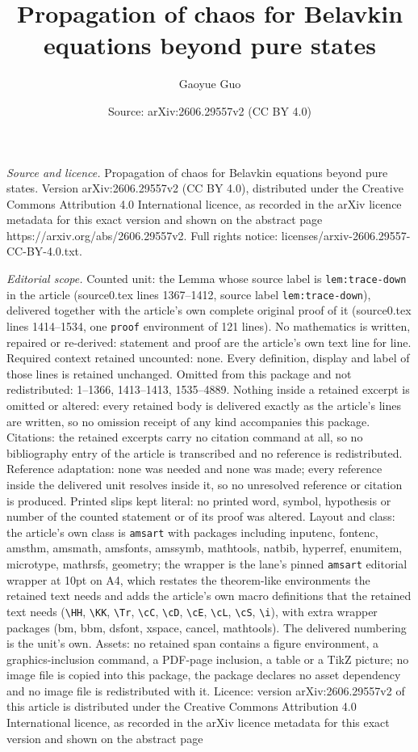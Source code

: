 \documentclass[10pt,a4paper]{amsart}
\title[Propagation of chaos for Belavkin equations beyond pure stat]{Propagation of chaos for Belavkin equations beyond pure states}
\author{Gaoyue Guo}
\date{Source: arXiv:2606.29557v2 (CC BY 4.0)}
\begin{document}
\maketitle

\noindent\emph{Source and licence.} Propagation of chaos for Belavkin equations beyond pure states. Version arXiv:2606.29557v2 (CC BY 4.0), distributed under the Creative Commons Attribution 4.0 International licence, as recorded in the arXiv licence metadata for this exact version and shown on the abstract page https://arxiv.org/abs/2606.29557v2. Full rights notice: licenses/arxiv-2606.29557-CC-BY-4.0.txt.\par\smallskip

\noindent\textit{Editorial scope.} Counted unit: the Lemma whose source label is \texttt{lem:trace-down} in the article (source0.tex lines 1367--1412, source label \texttt{lem:trace-down}), delivered together with the article's own complete original proof of it (source0.tex lines 1414--1534, one \texttt{proof} environment of 121 lines). No mathematics is written, repaired or re-derived: statement and proof are the article's own text line for line. Required context retained uncounted: none. Every definition, display and label of those lines is retained unchanged. Omitted from this package and not redistributed: 1--1366, 1413--1413, 1535--4889. Nothing inside a retained excerpt is omitted or altered: every retained body is delivered exactly as the article's lines are written, so no omission receipt of any kind accompanies this package. Citations: the retained excerpts carry no citation command at all, so no bibliography entry of the article is transcribed and no reference is redistributed. Reference adaptation: none was needed and none was made; every reference inside the delivered unit resolves inside it, so no unresolved reference or citation is produced. Printed slips kept literal: no printed word, symbol, hypothesis or number of the counted statement or of its proof was altered. Layout and class: the article's own class is \texttt{amsart} with packages including inputenc, fontenc, amsthm, amsmath, amsfonts, amssymb, mathtools, natbib, hyperref, enumitem, microtype, mathrsfs, geometry; the wrapper is the lane's pinned \texttt{amsart} editorial wrapper at 10pt on A4, which restates the theorem-like environments the retained text needs and adds the article's own macro definitions that the retained text needs (\texttt{\textbackslash HH}, \texttt{\textbackslash KK}, \texttt{\textbackslash Tr}, \texttt{\textbackslash cC}, \texttt{\textbackslash cD}, \texttt{\textbackslash cE}, \texttt{\textbackslash cL}, \texttt{\textbackslash cS}, \texttt{\textbackslash i}), with extra wrapper packages (bm, bbm, dsfont, xspace, cancel, mathtools). The delivered numbering is the unit's own. Assets: no retained span contains a figure environment, a graphics-inclusion command, a PDF-page inclusion, a table or a TikZ picture; no image file is copied into this package, the package declares no asset dependency and no image file is redistributed with it. Licence: version arXiv:2606.29557v2 of this article is distributed under the Creative Commons Attribution 4.0 International licence, as recorded in the arXiv licence metadata for this exact version and shown on the abstract page 
\end{document}
